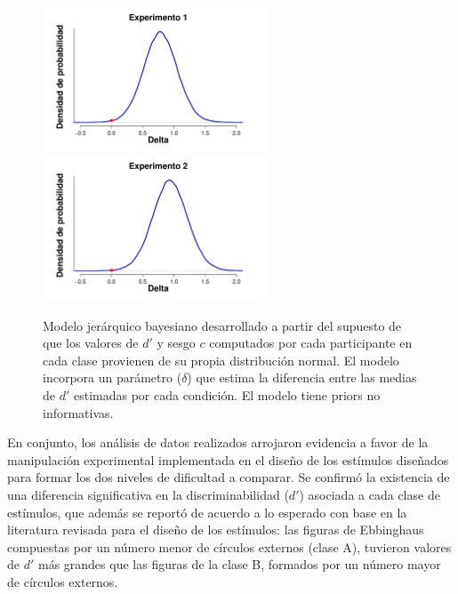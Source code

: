 \begin{figure}[th]
\centering
\includegraphics[width=0.6\textwidth]{Figures/MDelta_DensidadDelta_E1}\\
\includegraphics[width=0.6\textwidth]{Figures/MDelta_DensidadDelta_E2}\\
\caption[Modelo Delta: Densidad de probabilidad posterior para el valor del parámetro Delta]{Modelo jerárquico bayesiano desarrollado a partir del supuesto de que los valores de $d'$ y sesgo $c$ computados por cada participante en cada clase provienen de su propia distribución normal. El modelo incorpora un parámetro ($\delta$) que estima la diferencia entre las medias de $d'$ estimadas por cada condición. El modelo tiene priors no informativas.}
\label{fig:Delta}
\end{figure}

En conjunto, los análisis de datos realizados arrojaron evidencia a favor de la manipulación experimental implementada en el diseño de los estímulos diseñados para formar los dos niveles de dificultad a comparar. Se confirmó la existencia de una diferencia significativa en la discriminabilidad ($d'$) asociada a cada clase de estímulos, que además se reportó de acuerdo a lo esperado con base en la literatura revisada para el diseño de los estímulos: las figuras de Ebbinghaus compuestas por un número menor de círculos externos (clase A), tuvieron valores de $d'$ más grandes que las figuras de la clase B, formados por un número mayor de círculos externos.\\

